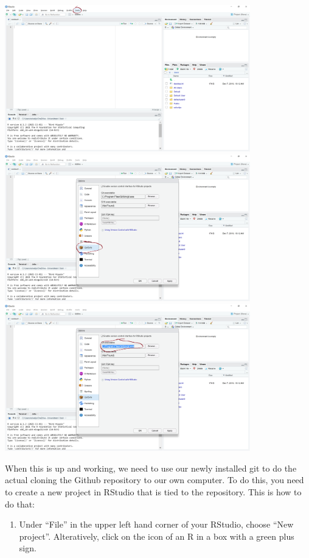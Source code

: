 \documentclass[
]{article}
\providecommand{\tightlist}{%
  \setlength{\itemsep}{0pt}\setlength{\parskip}{0pt}}
\begin{document}
\includegraphics[width=0.8\textwidth,height=\textheight]{./figures/git1.png}
\includegraphics[width=0.8\textwidth,height=\textheight]{./figures/git2.png}
\includegraphics[width=0.8\textwidth,height=\textheight]{./figures/git3.png}

When this is up and working, we need to use our newly installed git to
do the actual cloning the Github repository to our own computer. To do
this, you need to create a new project in RStudio that is tied to the
repository. This is how to do that:

\begin{enumerate}
\def\labelenumi{\arabic{enumi}.}
\tightlist
\item
  Under ``File'' in the upper left hand corner of your RStudio, choose
  ``New project''. Alteratively, click on the icon of an R in a box with
  a green plus sign.
\end{enumerate}
\end{document}
